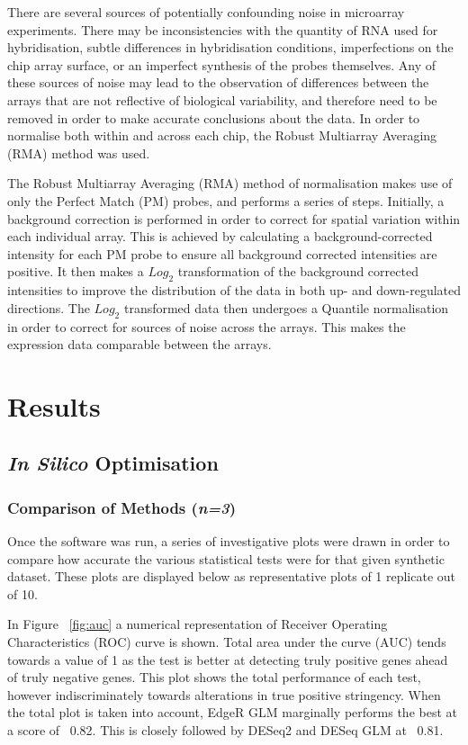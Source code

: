 There are several sources of potentially confounding noise in microarray experiments. There may be inconsistencies with the quantity of RNA used for hybridisation, subtle differences in hybridisation conditions, imperfections on the chip array surface, or an imperfect synthesis of the probes themselves. Any of these sources of noise may lead to the observation of differences between the arrays that are not reflective of biological variability, and therefore need to be removed in order to make accurate conclusions about the data. In order to normalise both within and across each chip, the Robust Multiarray Averaging (RMA) method was used. 

The Robust Multiarray Averaging (RMA) method of normalisation makes use of only the Perfect Match (PM) probes, and performs a series of steps. Initially, a background correction is performed in order to correct for spatial variation within each individual array. This is achieved by calculating a background-corrected intensity for each PM probe to ensure all background corrected intensities are positive. It then makes a $Log_{2}$ transformation of the background corrected intensities to improve the distribution of the data in both up- and down-regulated directions. The $Log_{2}$ transformed data then undergoes a Quantile normalisation in order to correct for sources of noise across the arrays. This makes the expression data comparable between the arrays.


\section{Results}

\subsection{\textit{In Silico} Optimisation}

\subsubsection{Comparison of Methods (\textit{n=3})}

Once the software was run, a series of investigative plots were drawn in order to compare how accurate the various statistical tests were for that given synthetic dataset. These plots are displayed below as representative plots of 1 replicate out of 10. 

In Figure ~\ref{fig:auc} a numerical representation of Receiver Operating Characteristics (ROC) curve is shown. Total area under the curve (AUC) tends towards a value of 1 as the test is better at detecting truly positive genes ahead of truly negative genes. This plot shows the total performance of each test, however indiscriminately towards alterations in true positive stringency. When the total plot is taken into account, EdgeR GLM marginally performs the best at a score of ~0.82. This is closely followed by DESeq2 and DESeq GLM at ~0.81. 

